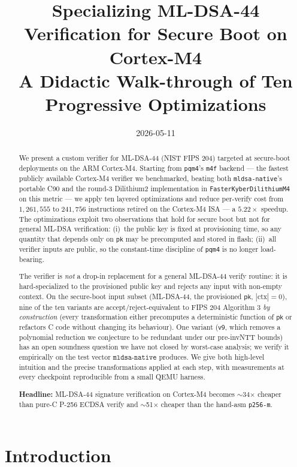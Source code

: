 \documentclass[11pt,a4paper]{article}
\title{\Large\bfseries Specializing ML-DSA-44 Verification for Secure Boot on Cortex-M4 \\
       \large A Didactic Walk-through of Ten Progressive Optimizations}
\date{2026-05-11}
\author{}
\begin{document}
\maketitle

\begin{abstract}
We present a custom verifier for ML-DSA-44 (NIST FIPS 204) targeted at
secure-boot deployments on the ARM Cortex-M4. Starting from
\texttt{pqm4}'s \texttt{m4f} backend --- the fastest publicly
available Cortex-M4 verifier we benchmarked, beating both
\texttt{mldsa-native}'s portable C90 and the round-3 Dilithium2
implementation in \texttt{FasterKyberDilithiumM4} on this metric ---
we apply ten layered optimizations and reduce per-verify cost from
$1{,}261{,}555$ to $241{,}756$ instructions retired on the
Cortex-M4 ISA --- a $\mathbf{5.22\times}$ speedup. The optimizations exploit
two observations that hold for secure boot but not for general ML-DSA
verification:
(i)~the public key is fixed at provisioning time, so any quantity that
depends only on $\textsf{pk}$ may be precomputed and stored in flash;
(ii)~all verifier inputs are public, so the constant-time discipline of
\texttt{pqm4} is no longer load-bearing.

The verifier is \emph{not} a drop-in replacement for a general ML-DSA-44
verify routine: it is hard-specialized to the provisioned public key
and rejects any input with non-empty context. On the secure-boot input
subset (ML-DSA-44, the provisioned $\textsf{pk}$, $|\mathrm{ctx}|=0$),
nine of the ten variants are accept/reject-equivalent to FIPS 204
Algorithm 3 \emph{by construction} (every transformation either
precomputes a deterministic function of $\textsf{pk}$ or refactors C
code without changing its behaviour). One variant ($\textsf{v9}$,
which removes a polynomial reduction we conjecture to be redundant
under our pre-invNTT bounds) has an open soundness question we have
not closed by worst-case analysis; we verify it empirically on the
test vector $\texttt{mldsa-native}$ produces. We give both high-level
intuition and the precise transformations applied at each step, with
measurements at every checkpoint reproducible from a small QEMU
harness.\smallskip

\noindent\textbf{Headline:} ML-DSA-44 signature verification on Cortex-M4
becomes $\sim$34$\times$ cheaper than pure-C P-256 ECDSA verify and
$\sim$51$\times$ cheaper than the hand-asm \texttt{p256-m}.
\end{abstract}

\section{Introduction}
\label{sec:intro}
\end{document}

